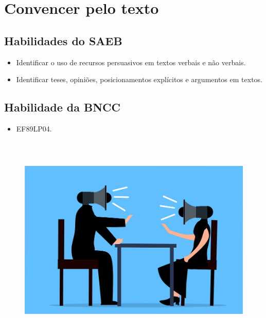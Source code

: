 \chapter{Convencer pelo texto}

\section{Habilidades do SAEB}

\begin{itemize}
\item
  Identificar o uso de recursos persuasivos em textos verbais e não
  verbais.
\item
  Identificar teses, opiniões, posicionamentos explícitos e argumentos
  em textos.
\end{itemize}

\section{Habilidade da BNCC}

\begin{itemize}
\item EF89LP04.
\end{itemize}


\begin{figure}
\centering
\includegraphics[width=5.90556in,height=4.00486in]{./_SAEB_9_POR/media/image1.png}
\end{figure}

